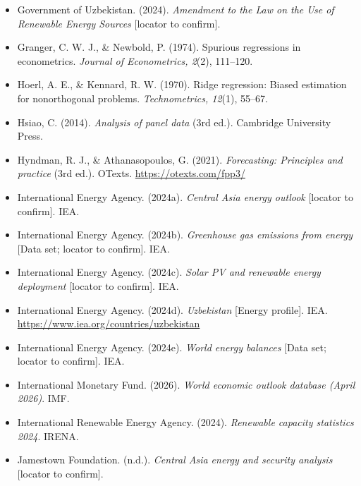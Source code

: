 \documentclass[10pt,twocolumn]{article}
\begin{document}
\begin{itemize}[leftmargin=1.2em,itemsep=1pt,topsep=2pt]
\item Government of Uzbekistan. (2024). \textit{Amendment to the Law on the Use of Renewable Energy Sources} [locator to confirm].

\item Granger, C. W. J., \& Newbold, P. (1974). Spurious regressions in econometrics. \textit{Journal of Econometrics, 2}(2), 111--120.

\item Hoerl, A. E., \& Kennard, R. W. (1970). Ridge regression: Biased estimation for nonorthogonal problems. \textit{Technometrics, 12}(1), 55--67.

\item Hsiao, C. (2014). \textit{Analysis of panel data} (3rd ed.). Cambridge University Press.

\item Hyndman, R. J., \& Athanasopoulos, G. (2021). \textit{Forecasting: Principles and practice} (3rd ed.). OTexts. \url{https://otexts.com/fpp3/}

\item International Energy Agency. (2024a). \textit{Central Asia energy outlook} [locator to confirm]. IEA.

\item International Energy Agency. (2024b). \textit{Greenhouse gas emissions from energy} [Data set; locator to confirm]. IEA.

\item International Energy Agency. (2024c). \textit{Solar PV and renewable energy deployment} [locator to confirm]. IEA.

\item International Energy Agency. (2024d). \textit{Uzbekistan} [Energy profile]. IEA. \url{https://www.iea.org/countries/uzbekistan}

\item International Energy Agency. (2024e). \textit{World energy balances} [Data set; locator to confirm]. IEA.

\item International Monetary Fund. (2026). \textit{World economic outlook database (April 2026)}. IMF.

\item International Renewable Energy Agency. (2024). \textit{Renewable capacity statistics 2024}. IRENA.

\item Jamestown Foundation. (n.d.). \textit{Central Asia energy and security analysis} [locator to confirm].


\end{itemize}
\end{document}

